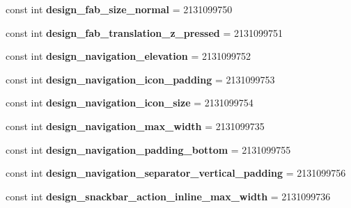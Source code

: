 \begin{DoxyCompactItemize}
const int {\bfseries design\+\_\+fab\+\_\+size\+\_\+normal} = 2131099750
\item 
\mbox{\label{classXaria_1_1Resource_1_1Dimension_ab56e711f48f3a5359f71b14b31e2369a}} 
const int {\bfseries design\+\_\+fab\+\_\+translation\+\_\+z\+\_\+pressed} = 2131099751
\item 
\mbox{\label{classXaria_1_1Resource_1_1Dimension_a897d498b708c3b7d6d114ab1cdcc36a1}} 
const int {\bfseries design\+\_\+navigation\+\_\+elevation} = 2131099752
\item 
\mbox{\label{classXaria_1_1Resource_1_1Dimension_a586c3ae11522601bdba05ba4ac98af7e}} 
const int {\bfseries design\+\_\+navigation\+\_\+icon\+\_\+padding} = 2131099753
\item 
\mbox{\label{classXaria_1_1Resource_1_1Dimension_a9365d7e076f4240593bc31f423802031}} 
const int {\bfseries design\+\_\+navigation\+\_\+icon\+\_\+size} = 2131099754
\item 
\mbox{\label{classXaria_1_1Resource_1_1Dimension_a64ba334e0fd189c3270305dccd0d00a8}} 
const int {\bfseries design\+\_\+navigation\+\_\+max\+\_\+width} = 2131099735
\item 
\mbox{\label{classXaria_1_1Resource_1_1Dimension_a8e565de026d0bfb09a7c855802ccc3b7}} 
const int {\bfseries design\+\_\+navigation\+\_\+padding\+\_\+bottom} = 2131099755
\item 
\mbox{\label{classXaria_1_1Resource_1_1Dimension_a19794bac826754146d1bd8aa1bc9fe36}} 
const int {\bfseries design\+\_\+navigation\+\_\+separator\+\_\+vertical\+\_\+padding} = 2131099756
\item 
\mbox{\label{classXaria_1_1Resource_1_1Dimension_a82fab0c21a8102cb29b27e04731d37ef}} 
const int {\bfseries design\+\_\+snackbar\+\_\+action\+\_\+inline\+\_\+max\+\_\+width} = 2131099736
\item 
\mbox{\label{classXaria_1_1Resource_1_1Dimension_ab04d8016e19eb3f6ffb440559105c1a2}} 

\end{DoxyCompactItemize}
